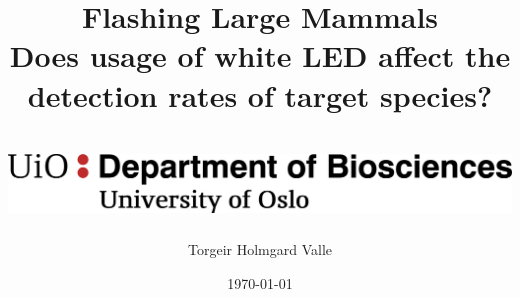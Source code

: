 \title{	
	{\large Flashing Large Mammals}\\
	{\small Does usage of white LED affect the detection rates of target species?}\\
	{~}\\
	{\includegraphics[scale=0.5]{./img/MN_IMBV_A_ENG.png}}\\
}
\author{Torgeir Holmgard Valle}
\date{\today}